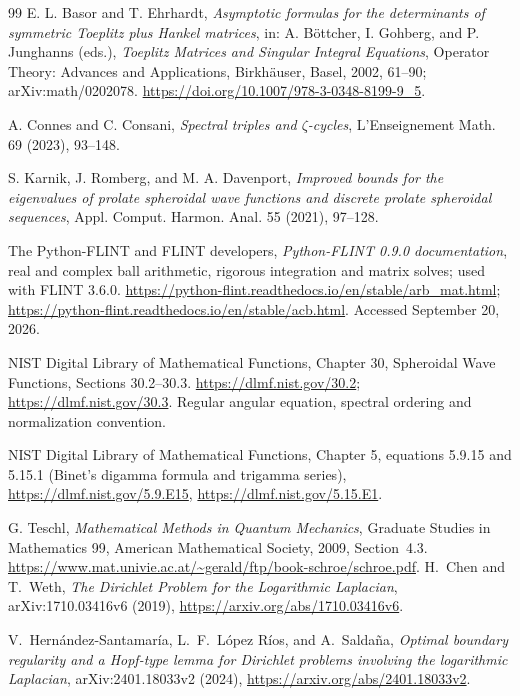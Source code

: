 \documentclass[11pt]{article}
\theoremstyle{remark}
\begin{document}
\begin{thebibliography}{99}
E. L. Basor and T. Ehrhardt,
\emph{Asymptotic formulas for the determinants of symmetric Toeplitz plus
Hankel matrices},
in: A. B\"ottcher, I. Gohberg, and P. Junghanns (eds.),
\emph{Toeplitz Matrices and Singular Integral Equations},
Operator Theory: Advances and Applications, Birkh\"auser, Basel, 2002, 61--90;
arXiv:math/0202078.
\url{https://doi.org/10.1007/978-3-0348-8199-9_5}.

A. Connes and C. Consani,
\emph{Spectral triples and $\zeta$-cycles},
L'Enseignement Math. 69 (2023), 93--148.

S. Karnik, J. Romberg, and M. A. Davenport,
\emph{Improved bounds for the eigenvalues of prolate spheroidal wave functions and discrete prolate spheroidal sequences},
Appl. Comput. Harmon. Anal. 55 (2021), 97--128.







The Python-FLINT and FLINT developers,
\emph{Python-FLINT 0.9.0 documentation}, real and complex ball arithmetic,
rigorous integration and matrix solves; used with FLINT 3.6.0.
\url{https://python-flint.readthedocs.io/en/stable/arb_mat.html};
\url{https://python-flint.readthedocs.io/en/stable/acb.html}.
Accessed September 20, 2026.

NIST Digital Library of Mathematical Functions, Chapter 30,
Spheroidal Wave Functions, Sections 30.2--30.3.
\url{https://dlmf.nist.gov/30.2};
\url{https://dlmf.nist.gov/30.3}.
Regular angular equation, spectral ordering and normalization convention.

NIST Digital Library of Mathematical Functions, Chapter 5,
equations 5.9.15 and 5.15.1 (Binet's digamma formula and trigamma series),
\url{https://dlmf.nist.gov/5.9.E15},
\url{https://dlmf.nist.gov/5.15.E1}.

G. Teschl, \emph{Mathematical Methods in Quantum Mechanics},
Graduate Studies in Mathematics 99, American Mathematical Society, 2009,
Section~4.3.
\url{https://www.mat.univie.ac.at/~gerald/ftp/book-schroe/schroe.pdf}.
H.~Chen and T.~Weth,
\emph{The Dirichlet Problem for the Logarithmic Laplacian},
arXiv:1710.03416v6 (2019),
\url{https://arxiv.org/abs/1710.03416v6}.

V.~Hern\'andez-Santamar\'ia, L.~F.~L\'opez R\'ios, and A.~Salda\~na,
\emph{Optimal boundary regularity and a Hopf-type lemma for Dirichlet
problems involving the logarithmic Laplacian},
arXiv:2401.18033v2 (2024),
\url{https://arxiv.org/abs/2401.18033v2}.


\end{thebibliography}
\end{document}
